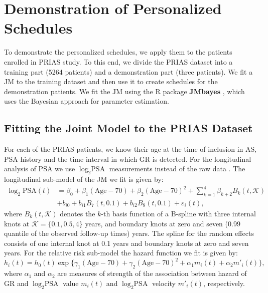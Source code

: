 
\section{Demonstration of Personalized Schedules}
\label{sec : pers_schedule_PRIAS}
To demonstrate the personalized schedules, we apply them to the patients enrolled in PRIAS study. To this end, we divide the PRIAS dataset into a training part (5264 patients) and a demonstration part (three patients). We fit a JM to the training dataset and then use it to create schedules for the demonstration patients. We fit the JM using the R package \textbf{JMbayes} \citep{rizopoulosJMbayes}, which uses the Bayesian approach for parameter estimation.

\subsection{Fitting the Joint Model to the PRIAS Dataset}
\label{subsec : jm_fit_prias}
For each of the PRIAS patients, we know their age at the time of inclusion in AS, PSA history and the time interval in which GR is detected. For the longitudinal analysis of PSA we use $\log_2 \mbox{PSA}$ measurements instead of the raw data \citep{nieboer2015nonlinear}. The longitudinal sub-model of the JM we fit is given by:
\begin{equation}
\label{eq : long_model_prias}
\begin{aligned}
\log_2 \mbox{PSA}(t) &= \beta_0 + \beta_1 (\mbox{Age}-70) + \beta_2 (\mbox{Age}-70)^2 + \sum_{k=1}^4 \beta_{k+2} B_k(t,\mathcal{K})\\ 
&+  b_{i0} + b_{i1} B_7(t, 0.1) + b_{i2} B_8(t, 0.1) +
\varepsilon_i(t),
\end{aligned}
\end{equation}
where $B_k(t, \mathcal{K})$ denotes the $k$-th basis function of a B-spline with three internal knots at $\mathcal{K} =\{0.1, 0.5, 4\}$ years, and boundary knots at zero and seven (0.99 quantile of the observed follow-up times) years. The spline for the random effects consists of one internal knot at 0.1 years and boundary knots at zero and seven years. For the relative risk sub-model the hazard function we fit is given by:
\begin{equation}
\label{eq : hazard_prias}
h_i(t) = h_0(t) \exp\big\{\gamma_1 (\mbox{Age}-70)  + \gamma_2 (\mbox{Age}-70)^2 + \alpha_1 m_i(t) + \alpha_2 m'_i(t)\big\},
\end{equation}
where $\alpha_1$ and $\alpha_2$ are measures of strength of the association between hazard of GR and $\log_2 \mbox{PSA}$ value $m_i(t)$ and $\log_2 \mbox{PSA}$ velocity $m'_i(t)$, respectively.


